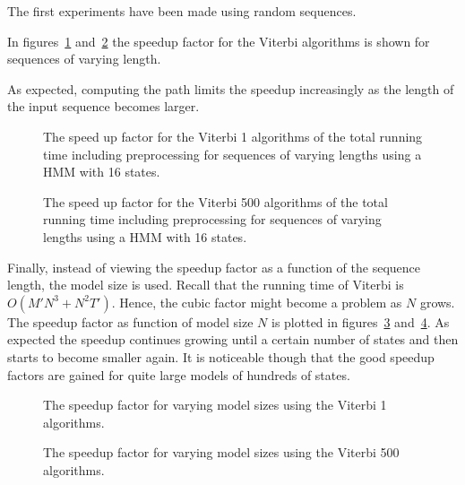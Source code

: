 The first experiments have been made using random sequences.

In figures~\ref{fig:compressed_1_speedup_vs_sequence_length}
and~\ref{fig:compressed_500_speedup_vs_sequence_length} the speedup factor for
the Viterbi algorithms is shown for sequences of varying length. 

As expected, computing the path limits the speedup increasingly as the length
of the input sequence becomes larger.

\begin{figure}
  \centering
  
  \caption{The speed up factor for the Viterbi 1 algorithms of the total
    running time including preprocessing for sequences of varying lengths using
    a HMM with 16 states.}
  \label{fig:compressed_1_speedup_vs_sequence_length}
\end{figure}

\begin{figure}
  \centering
  
  \caption{The speed up factor for the Viterbi 500 algorithms of the total
    running time including preprocessing for sequences of varying lengths using
    a HMM with 16 states.}
  \label{fig:compressed_500_speedup_vs_sequence_length}
\end{figure}

Finally, instead of viewing the speedup factor as a function of the sequence
length, the model size is used. Recall that the running time of Viterbi is
$O(M' N^3 + N^2 T')$. Hence, the cubic factor might become a problem as $N$
grows. The speedup factor as function of model size $N$ is plotted in
figures~\ref{fig:speedup_vs_k} and~\ref{fig:speedup_vs_k2}. As expected the
speedup continues growing until a certain number of states and then starts to
become smaller again. It is noticeable though that the good speedup factors are
gained for quite large models of hundreds of states.

\begin{figure}
  \centering
  
  \caption{The speedup factor for varying model sizes using the Viterbi 1
    algorithms.}
  \label{fig:speedup_vs_k}
\end{figure}

\begin{figure}
  \centering
  
  \caption{The speedup factor for varying model sizes using the Viterbi 500
    algorithms.}
  \label{fig:speedup_vs_k2}
\end{figure}

